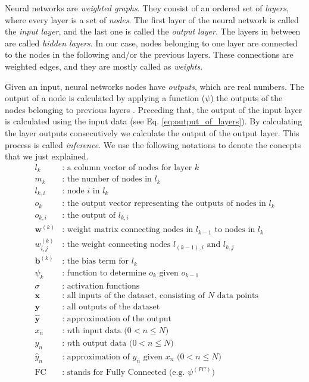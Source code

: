 Neural networks are \textit{weighted graphs}. They consist of an ordered set of \textit{layers}, where every layer is a set of \textit{nodes}. The first layer of the neural network is called the \textit{input layer}, and the last one is called the \textit{output layer}. The layers in between are called \textit{hidden layers}. In our case, nodes belonging to one layer are connected to the nodes in the following and/or the previous layers. These connections are weighted edges, and they are mostly called as \textit{weights}. 

Given an input, neural networks nodes have \textit{outputs}, which are real numbers. The output of a node is calculated by applying a function ($\psi$) the outputs of the nodes belonging to previous layers . Preceding that, the output of the input layer is calculated using the input data (see Eq. \ref{eq:output_of_layers}).  By calculating the layer outputs consecutively we calculate the output of the output layer. This process is called \textit{inference}. We use the following notations to denote the concepts that we just explained.
\begin{equation}
\label{eq:variable_definitions}
\begin{split}
l_k & \text{: a column vector of nodes for layer $k$}\\
m_k & \text{: the number of nodes in $l_k$}\\
l_{k,i}  & \text{: node $i$ in $l_k$}\\
o_{k}  & \text{: the output vector representing the outputs of nodes in $l_{k}$}\\
o_{k,i}  & \text{: the output of $l_{k,i}$}\\
\mathbf{w}^{(k)}  & \text{: weight matrix connecting nodes in $l_{k-1}$ to nodes in $l_{k}$} \\
w^{(k)}_{i,j}  & \text{: the weight connecting nodes $l_{(k-1),i}$ and $l_{k,j}$} \\
\mathbf{b}^{(k)}  & \text{: the bias term for $l_{k}$} \\
\psi_k & \text{: function to determine $o_k$ given $o_{k-1}$}\\
\sigma & \text{: activation functions} \\
\mathbf{x} & \text{: all inputs of the dataset, consisting of $N$ data points} \\
\mathbf{y} & \text{: all outputs of the dataset} \\
\mathbf{\hat y} & \text{: approximation of the output}  \\
x_n & \text{: $n$th input data ($0 < n \leq N$)} \\
y_n & \text{: $n$th output data ($0 < n \leq N$)} \\
\hat y_n & \text{: approximation of $y_n$ given $x_n$ ($0 < n \leq N$)}\\
\text{FC} & \text{: stands for Fully Connected (e.g. $\psi^{(FC)}$)}
\end{split}
\end{equation}
